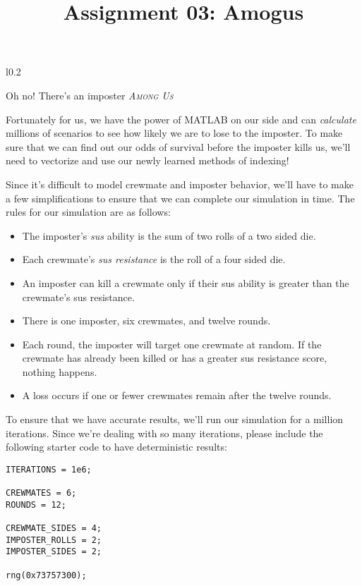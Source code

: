 \documentclass{article}
\title{Assignment 03: Amogus}
\begin{document}
\renderTitle

\begin{wrapfigure}{l}{0.2\textwidth}
\end{wrapfigure}

Oh no!  There's an imposter \textit{\textsc{Among Us}} 

Fortunately for us, we have the power of MATLAB on our side and can
\emph{calculate} millions of scenarios to see how likely we are to lose
to the imposter.  To make sure that we can find out our odds of survival
before the imposter kills us, we'll need to vectorize and use our newly
learned methods of indexing!

Since it's difficult to model crewmate and imposter behavior, we'll have
to make a few simplifications to ensure that we can complete our
simulation in time.  The rules for our simulation are as follows:

\begin{itemize}[leftmargin=*]
	\item
		The imposter's \emph{sus} ability is the sum of two
		rolls of a two sided die.

	\item
		Each crewmate's \emph{sus resistance} is the roll of a
		four sided die.

	\item
		An imposter can kill a crewmate only if their sus ability is
		greater than the crewmate's sus resistance.

	\item
		There is one imposter, six crewmates, and twelve rounds.

	\item
		Each round, the imposter will target one crewmate at
		random.  If the crewmate has already been killed or has
		a greater sus resistance score, nothing happens.

	\item
		A loss occurs if one or fewer crewmates remain after the
		twelve rounds.
\end{itemize}

To ensure that we have accurate results, we'll run our simulation for a
million iterations.  Since we're dealing with so many iterations, please
include the following starter code to have deterministic results:

\begin{verbatim}
ITERATIONS = 1e6;

CREWMATES = 6;
ROUNDS = 12;

CREWMATE_SIDES = 4;
IMPOSTER_ROLLS = 2;
IMPOSTER_SIDES = 2;

rng(0x73757300);
\end{verbatim}
\end{document}
